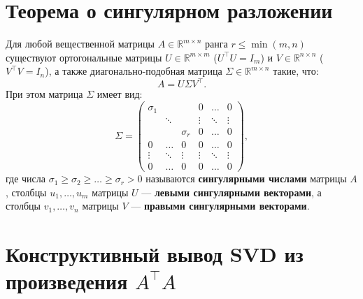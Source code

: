     \section{Теорема о сингулярном разложении}

    \begin{theorem}
Для любой вещественной матрицы $A \in \mathbb{R}^{m \times n}$ ранга $r \le \min(m, n)$ существуют ортогональные матрицы
$U \in \mathbb{R}^{m \times m}$ ($U^\top U = I_m$) и $V \in \mathbb{R}^{n \times n}$ ($V^\top V = I_n$), а также
диагонально-подобная матрица $\Sigma \in \mathbb{R}^{m \times n}$ такие, что:
\[ A = U \Sigma V^\top. \]
При этом матрица $\Sigma$ имеет вид:
\[
    \Sigma = \begin{pmatrix}
                 \sigma_1 & & & 0 & \dots & 0 \\
                 & \ddots & & \vdots & \ddots & \vdots \\
                 & & \sigma_r & 0 & \dots & 0 \\
                 0 & \dots & 0 & 0 & \dots & 0 \\
                 \vdots & \ddots & \vdots & \vdots & \ddots & \vdots \\
                 0 & \dots & 0 & 0 & \dots & 0
    \end{pmatrix},
\]
где числа $\sigma_1 \ge \sigma_2 \ge \dots \ge \sigma_r > 0$ называются \textbf{сингулярными числами} матрицы $A$,
столбцы $u_1, \dots, u_m$ матрицы $U$ — \textbf{левыми сингулярными векторами}, а столбцы $v_1, \dots, v_n$ матрицы $V$
— \textbf{правыми сингулярными векторами}.
    \end{theorem}

    \section{Конструктивный вывод SVD из произведения $A^\top A$}

